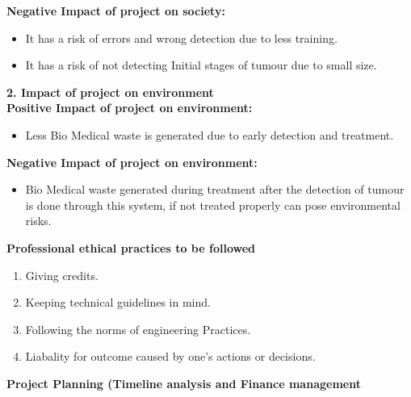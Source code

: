 {\textbf{Negative Impact of project on society:}}
\begin{itemize}
    \item It has a risk of errors and wrong detection due to less training.
    \item It has a risk of not detecting Initial stages of tumour due to small size.
\end{itemize}
{\textbf{2. Impact of project on environment }}\\
{\textbf{Positive Impact of project on environment: }}
\begin{itemize}
    \item  Less Bio Medical waste is generated due to early detection and treatment.
\end{itemize}
{\textbf{Negative Impact of project on environment: }}
\begin{itemize}
    \item Bio Medical waste generated during treatment after the detection of tumour is done through this system, if not treated properly can pose environmental risks.
\end{itemize}
{\bf \Large Professional ethical practices to be followed}
\begin{enumerate}
\item Giving credits.
\item Keeping technical guidelines in mind.
\item Following the norms of engineering Practices.
\item Liabality for outcome caused by one's actions or decisions.
\end{enumerate}
{\bf \Large Project Planning (Timeline analysis and Finance management}\\

